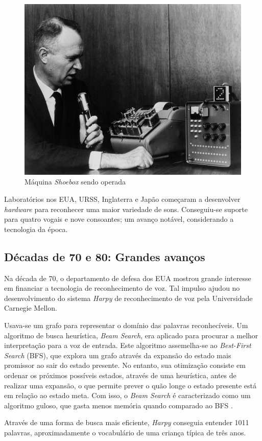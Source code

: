 \begin{figure}[H]
  \centering
  \includegraphics[width=.5\textwidth]{image/shoebox.jpg}
  \caption{Máquina \textit{Shoebox} sendo operada \citep{shoeboxImage}}
  \label{shoebox}
\end{figure}

Laboratórios nos EUA, URSS, Inglaterra e Japão começaram a desenvolver \textit{hardware} para reconhecer uma maior variedade de sons. Conseguiu-se suporte para quatro vogais e nove consoantes; um avanço notável, considerando a tecnologia da época.


\subsection{Décadas de 70 e 80: Grandes avanços}

Na década de 70, o departamento de defesa dos EUA mostrou grande interesse em financiar a tecnologia de reconhecimento de voz. Tal impulso ajudou no desenvolvimento do sistema \emph{Harpy} de reconhecimento de voz pela Universidade Carnegie Mellon.

Usava-se um grafo para representar o domínio das palavras reconhecíveis. Um algoritmo de busca heurística, \emph{Beam Search}, era aplicado para procurar a melhor interpretação para a voz de entrada. Este algoritmo assemelha-se ao \textit{Best-First Search} (BFS), que explora um grafo através da expansão do estado mais promissor ao sair do estado presente. No entanto, sua otimização consiste em ordenar os próximos possíveis estados, através de uma heurística, antes de realizar uma expansão, o que permite prever o quão longe o estado presente está em relação ao estado meta. Com isso, o \textit{Beam Search} é caracterizado como um algoritmo guloso, que gasta menos memória quando comparado ao BFS \citep{beamSearch}.

Através de uma forma de busca mais eficiente, \textit{Harpy} conseguia entender 1011 palavras, aproximadamente o vocabulário de uma criança típica de três anos.

